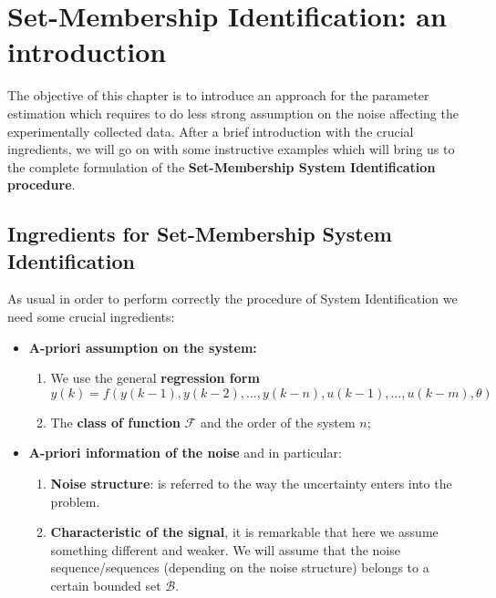 \chapter{Set-Membership Identification: an introduction}

The objective of this chapter is to introduce an approach for the parameter estimation which requires to do less strong assumption on the noise affecting the experimentally collected data. After a brief introduction with the crucial ingredients, we will go on with some instructive examples which will bring us to the complete formulation of the \textbf{Set-Membership System Identification procedure}.

\section{Ingredients for Set-Membership System Identification}
As usual in order to perform correctly the procedure of System Identification we need some crucial ingredients:
\begin{itemize}
    \itemsep-0.2em
    \item[\ding{182}] \textbf{\textsf{A-priori assumption on the system:}}
    \begin{enumerate}
        \item[\ding{51}] We use the general \textbf{regression form} 
        \begin{equation} 
            y(k)=f(y(k-1), y(k-2),  ..., y(k-n), u(k-1), ..., u(k-m), \theta)
        \end{equation}
        \item[\ding{51}] The \textbf{class of function} $\mathcal{F}$ and the order of the system $n$;     
    \end{enumerate}
   
    \item[\ding{184}] \textbf{\textsf{A-priori information of the noise}} and in particular:
    \begin{enumerate}  
        \itemsep-0.2em
        \item[\ding{51}] \textbf{Noise structure}: is referred to the way the uncertainty enters  into the problem.
        \item[\ding{51}] \textbf{Characteristic of the signal}, it is remarkable that here we assume something different and weaker. We will assume that the noise sequence/sequences (depending on the noise structure) belongs to a certain bounded set $\mathcal{B}$.
    \end{enumerate}
\end{itemize}

